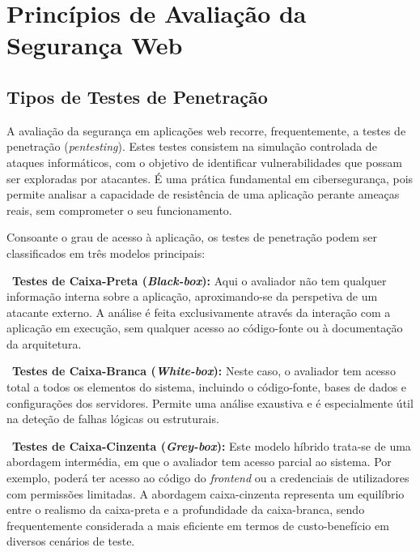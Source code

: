 \section{Princípios de Avaliação da Segurança Web}

\subsection{Tipos de Testes de Penetração}

A avaliação da segurança em aplicações web recorre, frequentemente, a testes de penetração (\textit{pentesting}). Estes testes consistem na simulação controlada de ataques informáticos, com o objetivo de identificar vulnerabilidades que possam ser exploradas por atacantes. É uma prática fundamental em cibersegurança, pois permite analisar a capacidade de resistência de uma aplicação perante ameaças reais, sem comprometer o seu funcionamento.

Consoante o grau de acesso à aplicação, os testes de penetração podem ser classificados em três modelos principais:

\begin{flushleft}
\textbullet\ \textbf{Testes de Caixa-Preta (\textit{Black-box}):} Aqui o avaliador não tem qualquer informação interna sobre a aplicação, aproximando-se da perspetiva de um atacante externo. A análise é feita exclusivamente através da interação com a aplicação em execução, sem qualquer acesso ao código-fonte ou à documentação da arquitetura.

\vspace{0.4cm}

\textbullet\ \textbf{Testes de Caixa-Branca (\textit{White-box}):} Neste caso, o avaliador tem acesso total a todos os elementos do sistema, incluindo o código-fonte, bases de dados e configurações dos servidores. Permite uma análise exaustiva e é especialmente útil na deteção de falhas lógicas ou estruturais.

\vspace{0.4cm}

\textbullet\ \textbf{Testes de Caixa-Cinzenta (\textit{Grey-box}):} Este modelo híbrido trata-se de uma abordagem intermédia, em que o avaliador tem acesso parcial ao sistema. Por exemplo, poderá ter acesso ao código do \textit{frontend} ou a credenciais de utilizadores com permissões limitadas. A abordagem caixa-cinzenta representa um equilíbrio entre o realismo da caixa-preta e a profundidade da caixa-branca, sendo frequentemente considerada a mais eficiente em termos de custo-benefício em diversos cenários de teste.
\end{flushleft}

